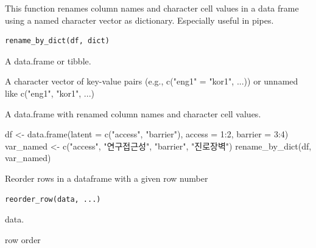 \documentclass[a4paper]{book}
\begin{document}
%
\begin{Description}
This function renames column names and character cell values in a data frame
using a named character vector as dictionary. Especially useful in pipes.
\end{Description}
%
\begin{Usage}
\begin{verbatim}
rename_by_dict(df, dict)
\end{verbatim}
\end{Usage}
%
\begin{Arguments}
\begin{ldescription}
\item[\code{df}] A data.frame or tibble.

\item[\code{dict}] A character vector of key-value pairs (e.g., c("eng1" = "kor1", ...)) or unnamed like c("eng1", "kor1", ...)
\end{ldescription}
\end{Arguments}
%
\begin{Value}
A data.frame with renamed column names and character cell values.
\end{Value}
%
\begin{Examples}
\begin{ExampleCode}
df <- data.frame(latent = c("access", "barrier"), access = 1:2, barrier = 3:4)
var_named <- c("access", "연구접근성", "barrier", "진로장벽")
rename_by_dict(df, var_named)
\end{ExampleCode}
\end{Examples}
%
\begin{Description}
Reorder rows in a dataframe with a given row number
\end{Description}
%
\begin{Usage}
\begin{verbatim}
reorder_row(data, ...)
\end{verbatim}
\end{Usage}
%
\begin{Arguments}
\begin{ldescription}
\item[\code{data}] data.

\item[\code{...}] row order
\end{ldescription}
\end{Arguments}
\end{document}
